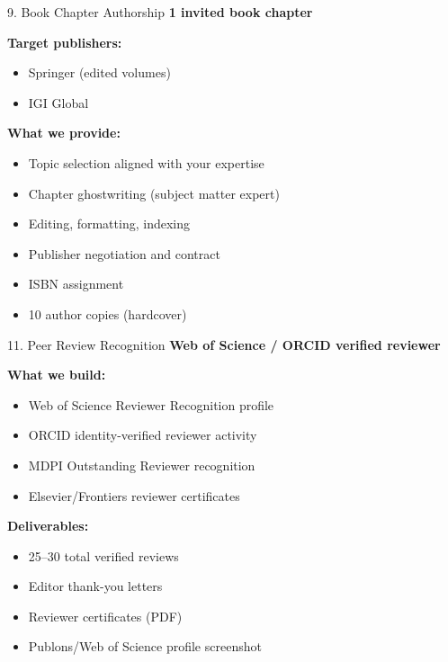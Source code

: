 \documentclass[aspectratio=169, 10pt]{beamer}
\begin{document}
	\begin{frame}{9. Book Chapter Authorship}
		\faBook \hspace{0.2cm} \textbf{1 invited book chapter}
		
		\textbf{Target publishers:}
		\begin{itemize}
			\item Springer (edited volumes)
			\item IGI Global
		\end{itemize}
		
		\textbf{What we provide:}
		\begin{itemize}
			\item Topic selection aligned with your expertise
			\item Chapter ghostwriting (subject matter expert)
			\item Editing, formatting, indexing
			\item Publisher negotiation and contract
			\item ISBN assignment
			\item 10 author copies (hardcover)
		\end{itemize}
	\end{frame}
	
	\begin{frame}{11. Peer Review Recognition}
		\faCheckCircle \hspace{0.2cm} \textbf{Web of Science / ORCID verified reviewer}
		
		\textbf{What we build:}
		\begin{itemize}
			\item Web of Science Reviewer Recognition profile
			\item ORCID identity-verified reviewer activity
			\item MDPI Outstanding Reviewer recognition
			\item Elsevier/Frontiers reviewer certificates
		\end{itemize}
		
		\textbf{Deliverables:}
		\begin{itemize}
			\item 25–30 total verified reviews
			\item Editor thank-you letters
			\item Reviewer certificates (PDF)
			\item Publons/Web of Science profile screenshot
		\end{itemize}
	\end{frame}
	
\end{document}
